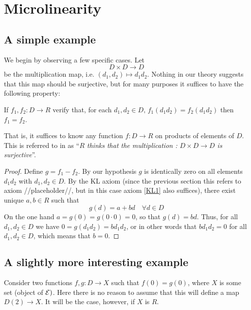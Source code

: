 \chapter{Microlinearity} \label{sec:microlinearity}

\section{A simple example}

We begin by observing a few specific cases. Let
\begin{equation*}
   D\times D \to D 
\end{equation*}
be the multiplication map, i.e. \( (d_1,d_2)\mapsto d_1d_2 \). Nothing in our theory suggests that this map should be surjective, but for many purposes it suffices to have the following property:

\begin{proposition}
  If \( f_1,f_2:D \to R \) verify that, for each \( d_1,d_2\in D,\, f_1(d_1d_2) = f_2(d_1d_2)  \) then \( f_1=f_2 \).
\end{proposition}

That is, it suffices to know any function \( f:D\to R \) on products of elements of \( D \). This is referred to in \cite{kock06} as ``\emph{\( R \) thinks that the multiplication : \( D\times D\to D \) is surjective}''.

\begin{proof}
  Define \( g = f_1-f_2 \). By our hypothesis \( g \) is identically zero on all elements \( d_1d_2 \) with \( d_1,d_2\in D \). By the KL axiom (since the previous section this refers to axiom {//placeholder//}, but in this case axiom \ref{KL1} also suffices), there exist unique \( a,b\in R \) such that
  \begin{equation*}
    g(d)=a + bd\quad \forall d\in D 
  \end{equation*}
  On the one hand \( a=g(0)=g(0\cdot 0) = 0 \), so that \( g(d)=bd \). Thus, for all \( d_1,d_2\in D \) we have \( 0 = g(d_1d_2) = bd_1d_2 \), or in other words that \( bd_1d_2=0 \) for all \( d_1,d_2\in D \), which means that \( b=0 \).
\end{proof}

\section{A slightly more interesting example}

Consider two functions \( f,g:D\to X \) such that \( f(0)=g(0) \), where \( X \) is some set (object of \(  \mathcal{E}) \). Here there is no reason to assume that this will define a map \( D(2)\to X \). It will be the case, however, if \( X \) is \( R \).

